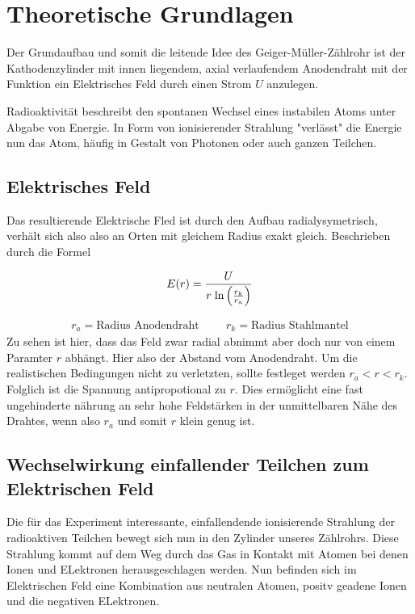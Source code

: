 \newpage
\section{Theoretische Grundlagen}

Der Grundaufbau und somit die leitende Idee des Geiger-Müller-Zählrohr ist der Kathodenzylinder %
mit innen liegendem, axial verlaufendem Anodendraht mit der Funktion ein Elektrisches Feld durch einen Strom $U$ anzulegen.

Radioaktivität beschreibt den spontanen Wechsel eines instabilen Atoms unter Abgabe von Energie. In Form von ionisierender Strahlung "verlässt" die Energie nun das Atom, häufig in Gestalt von Photonen oder auch ganzen Teilchen.



\subsection{Elektrisches Feld}

Das resultierende Elektrische Fled ist durch den Aufbau radialysymetrisch, verhält sich also also an Orten mit gleichem Radius exakt gleich.
Beschrieben durch die Formel 

\begin{equation}  %
\label{eqn:efeld}
E(r) = \frac{U}{r \hspace{0.1cm} \text{ln} \left( \frac{r_k}{r_a} \right) }
\end{equation}

\begin{align*}
r_a = \text{Radius Anodendraht}     \hspace{1cm} r_k = \text{Radius Stahlmantel}
\end{align*}
Zu sehen ist hier, dass das Feld zwar radial abnimmt aber doch nur von einem Paramter $r$ abhängt. Hier also der Abstand vom Anodendraht.
Um die realistischen Bedingungen nicht zu verletzten, sollte festleget werden $r_a<r<r_k$.
Folglich ist die Spannung antipropotional zu $r$. Dies ermöglicht eine fast ungehinderte nährung an sehr hohe Feldstärken in der unmittelbaren Nähe des Drahtes, wenn also $r_a$ und somit $r$ klein genug ist. 

\subsection{Wechselwirkung einfallender Teilchen zum Elektrischen Feld} %
Die für das Experiment interessante, einfallendende ionisierende Strahlung der radioaktiven Teilchen bewegt sich nun in den Zylinder unseres Zählrohrs.
Diese Strahlung kommt auf dem Weg durch das Gas in Kontakt mit Atomen bei denen Ionen und ELektronen herausgeschlagen werden. 
Nun befinden sich im Elektrischen Feld eine Kombination aus neutralen Atomen, positv geadene Ionen und die negativen ELektronen. 

